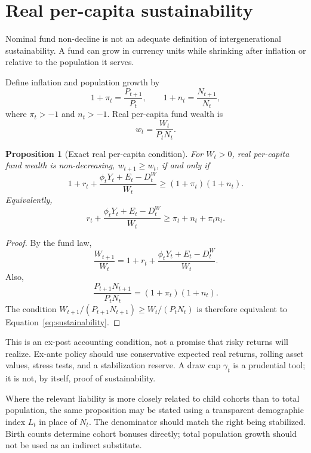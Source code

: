 \documentclass[11pt]{article}
\newtheorem{proposition}[definition]{Proposition}
\begin{document}
\section{Real per-capita sustainability}

Nominal fund non-decline is not an adequate definition of intergenerational
sustainability. A fund can grow in currency units while shrinking after inflation or
relative to the population it serves.

Define inflation and population growth by
\begin{equation}
  1+\pi_t=\frac{P_{t+1}}{P_t},
  \qquad
  1+n_t=\frac{N_{t+1}}{N_t},
\end{equation}
where $\pi_t>-1$ and $n_t>-1$. Real per-capita fund wealth is
\begin{equation}
  w_t=\frac{W_t}{P_tN_t}.
\end{equation}

\begin{proposition}[Exact real per-capita condition]
For $W_t>0$, real per-capita fund wealth is non-decreasing, $w_{t+1}\ge w_t$, if and only
if
\begin{equation}\label{eq:sustainability}
  1+r_t+\frac{\phi_tY_t+E_t-D_t^W}{W_t}
  \ge(1+\pi_t)(1+n_t).
\end{equation}
Equivalently,
\begin{equation}
  r_t+\frac{\phi_tY_t+E_t-D_t^W}{W_t}
  \ge \pi_t+n_t+\pi_tn_t.
\end{equation}
\end{proposition}

\begin{proof}
By the fund law,
\[
\frac{W_{t+1}}{W_t}
=1+r_t+\frac{\phi_tY_t+E_t-D_t^W}{W_t}.
\]
Also,
\[
\frac{P_{t+1}N_{t+1}}{P_tN_t}=(1+\pi_t)(1+n_t).
\]
The condition $W_{t+1}/(P_{t+1}N_{t+1})\ge W_t/(P_tN_t)$ is therefore equivalent to
Equation~\eqref{eq:sustainability}.
\end{proof}

This is an ex-post accounting condition, not a promise that risky returns will realize.
Ex-ante policy should use conservative expected real returns, rolling asset values,
stress tests, and a stabilization reserve. A draw cap $\gamma_t$ is a prudential tool;
it is not, by itself, proof of sustainability.

Where the relevant liability is more closely related to child cohorts than to total
population, the same proposition may be stated using a transparent demographic index
$L_t$ in place of $N_t$. The denominator should match the right being stabilized. Birth
counts determine cohort bonuses directly; total population growth should not be used as
an indirect substitute.
\end{document}
